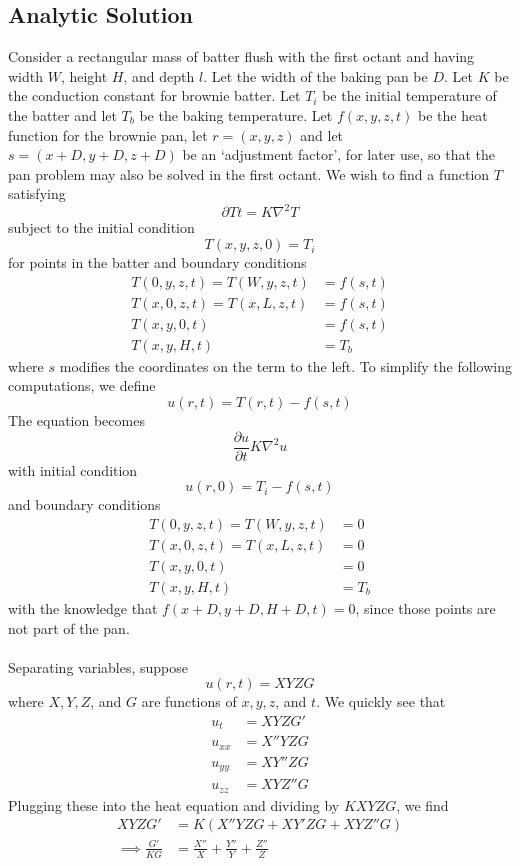 \documentclass[12pt]{reedmcm}
\begin{document}
\subsection{Analytic Solution} 
Consider a rectangular mass of batter flush with the first octant and having width $W$, height $H$, and depth $l$.  Let the width of the baking pan be $D$.  Let $K$ be the conduction constant for brownie batter.  Let $T_i$ be the initial temperature of the batter and let $T_b$ be the baking temperature.  Let $f(x,y,z,t)$ be the heat function for the brownie pan, let $r = (x,y,z)$ and let $s = (x + D, y+D, z+D)$ be an `adjustment factor', for later use, so  that the pan problem may also be solved in the first octant.  We wish to find a function $T$ satisfying
\[\partial{T}{t} = K \nabla^2 T\]
subject to the initial condition
\[T(x,y,z,0) = T_i\]
for points in the batter and boundary conditions \begin{align*}
T(0,y,z,t) = T(W,y,z,t) &= f(s,t)\\
T(x,0,z,t) = T(x,L,z,t) &= f(s,t)\\
T(x,y,0,t) &= f(s,t)\\
T(x,y,H,t) &= T_b \end{align*}
where $s$ modifies the coordinates on the term to the left.
To simplify the following computations, we define
\[u(r,t) = T(r,t) - f(s,t)\]
The equation becomes 
\[\frac{\partial u}{\partial t} K \nabla^2 u\]
with initial condition
\[u(r,0) = T_i - f(s,t)\]
and boundary conditions \begin{align*}
T(0,y,z,t) = T(W,y,z,t) &= 0\\
T(x,0,z,t) = T(x,L,z,t) &= 0\\
T(x,y,0,t) &= 0\\
T(x,y,H,t) &= T_b\end{align*}
with the knowledge that $f(x+D, y+D, H+D, t) = 0$, since those points are not part of the pan.\\
\\
Separating variables, suppose
\[u(r,t) = XYZG\]
where $X,Y,Z$, and $G$ are functions of $x,y,z$, and $t$.  We quickly see that \begin{align*}
u_t &= XYZG'\\
u_{xx} &= X''YZG\\
u_{yy} &= XY''ZG\\
u_{zz} &= XYZ''G \end{align*}
Plugging these into the heat equation and dividing by $KXYZG$, we find \begin{align*}
XYZG' &= K(X''YZG +XY'ZG + XYZ''G)\\
\implies \frac{G'}{KG}  &= \frac{X''}{X} + \frac{Y''}{Y} + \frac{Z''}{Z} \end{align*}
\end{document}
